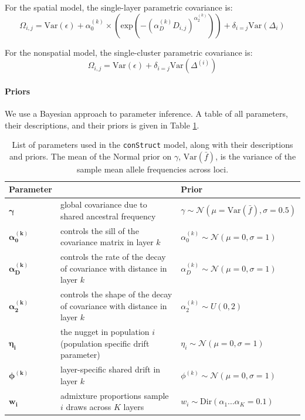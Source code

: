 \documentclass[12pt]{article}
\begin{document}
For the spatial model, the single-layer parametric covariance is:
\begin{equation}
\Omega_{i,j} = \text{Var}(\epsilon) + 
\alpha^{(k)}_0 \times \left(\text{exp} \left(  -(\alpha^{(k)}_D D_{i,j})^{\alpha^{(k)}_2}\right) \right)	 +
\delta_{i=j} \text{Var}(\Delta_i)
\label{admixed_continuous_cov}
\end{equation}

For the nonspatial model, the single-cluster parametric covariance is:
\begin{equation}
\Omega_{i,j} = \text{Var}(\epsilon) + \delta_{i=j} \text{Var}(\Delta^{(i)})
\label{admixed_discrete_covariance}
\end{equation}

\paragraph{Priors}
We use a Bayesian approach to parameter inference.
A table of all parameters, their descriptions, and their priors is given in Table \ref{tab:param_prior_tab}.

\begin{centering}
\begin{table}
\begin{tabular}{| >{\centering\arraybackslash}m{2.1cm} | m{5.2cm} | >{\centering\arraybackslash}m{5.1cm} |}
	\hline
	\textbf{Parameter} & \centering{\textbf{Description}} & \textbf{Prior}\\ \hline
	$\boldsymbol{\gamma}$ & 
		global covariance due to shared ancestral frequency & 
		$\gamma \sim \mathcal{N}(\mu = \text{Var}(\bar{f}), \sigma = 0.5)$\\ \hline
	$\boldsymbol{\alpha^{(k)}_0}$ & 
		controls the sill of the covariance matrix in layer $k$& 
		$\alpha^{(k)}_0 \sim \mathcal{N}(\mu = 0, \sigma = 1)$\\ \hline
	$\boldsymbol{\alpha^{(k)}_D}$ & 
		controls the rate of the decay of covariance with distance in layer $k$& 
		$\alpha^{(k)}_D \sim \mathcal{N}(\mu = 0, \sigma = 1)$\\ \hline
	$\boldsymbol{\alpha^{(k)}_2}$ & 
		controls the shape of the decay of covariance with distance in layer $k$ & 
		$\alpha^{(k)}_2 \sim U(0,2)$\\ \hline
	$\boldsymbol{\eta_i}$ & 
		the nugget in population $i$ (population specific drift parameter)  & 
		$\eta_i \sim \mathcal{N}(\mu = 0, \sigma = 1)$\\ \hline
	$\boldsymbol{\phi^{(k)}}$ & 
		layer-specific shared drift in layer $k$ &
		 $\phi^{(k)} \sim \mathcal{N}(\mu = 0, \sigma = 1)$\\ \hline
	$\boldsymbol{w_i}$ &
		admixture proportions sample $i$ draws across $K$ layers &
		$w_i \sim \text{Dir}(\alpha_{1} ... \alpha_{K}=0.1)$  \\ \hline
	\hline
\end{tabular}
\caption{
List of parameters used in the \texttt{conStruct} model, along with their descriptions and priors.
The mean of the Normal prior on $\gamma$, $\text{Var}(\bar{f})$, is the variance of the sample mean allele frequencies across loci.
}\label{tab:param_prior_tab}
\end{table}
\end{centering}
\end{document}
